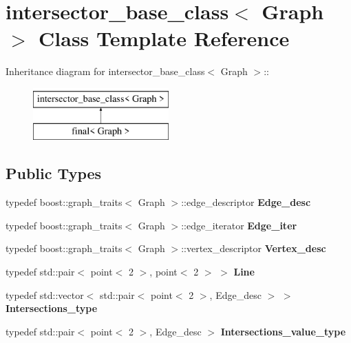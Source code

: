 \hypertarget{classintersector__base__class}{
\section{intersector\_\-base\_\-class$<$ Graph $>$ Class Template Reference}
\label{classintersector__base__class}
}
Inheritance diagram for intersector\_\-base\_\-class$<$ Graph $>$::\begin{figure}[H]
\begin{center}
\leavevmode
\includegraphics[height=2cm]{classintersector__base__class}
\end{center}
\end{figure}
\subsection*{Public Types}
\begin{DoxyCompactItemize}
\item 
\hypertarget{classintersector__base__class_aa920b0069f7bbbcfc63ff414e5fb40e7}{
typedef boost::graph\_\-traits$<$ Graph $>$::edge\_\-descriptor {\bfseries Edge\_\-desc}}
\label{classintersector__base__class_aa920b0069f7bbbcfc63ff414e5fb40e7}

\item 
\hypertarget{classintersector__base__class_a5a2f61f96a7efaef6f91fa743a799a9a}{
typedef boost::graph\_\-traits$<$ Graph $>$::edge\_\-iterator {\bfseries Edge\_\-iter}}
\label{classintersector__base__class_a5a2f61f96a7efaef6f91fa743a799a9a}

\item 
\hypertarget{classintersector__base__class_a197f03d7b72cd9fb141e619e3604da05}{
typedef boost::graph\_\-traits$<$ Graph $>$::vertex\_\-descriptor {\bfseries Vertex\_\-desc}}
\label{classintersector__base__class_a197f03d7b72cd9fb141e619e3604da05}

\item 
\hypertarget{classintersector__base__class_a11ff6c047c7579ba8da998a38b62f092}{
typedef std::pair$<$ point$<$ 2 $>$, point$<$ 2 $>$ $>$ {\bfseries Line}}
\label{classintersector__base__class_a11ff6c047c7579ba8da998a38b62f092}

\item 
\hypertarget{classintersector__base__class_aeead4d06ad6300f189924f29bc15e0d4}{
typedef std::vector$<$ std::pair$<$ point$<$ 2 $>$, Edge\_\-desc $>$ $>$ {\bfseries Intersections\_\-type}}
\label{classintersector__base__class_aeead4d06ad6300f189924f29bc15e0d4}

\item 
\hypertarget{classintersector__base__class_abf991566a0fca9f2601f028ead8890ea}{
typedef std::pair$<$ point$<$ 2 $>$, Edge\_\-desc $>$ {\bfseries Intersections\_\-value\_\-type}}
\label{classintersector__base__class_abf991566a0fca9f2601f028ead8890ea}

\end{DoxyCompactItemize}
